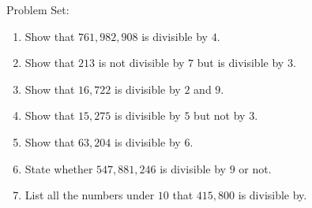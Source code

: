 \documentclass[16pt]{article}
\theoremstyle{remark}
\begin{document}
Problem Set:
\begin{enumerate}
\item Show that $761,982,908$ is divisible by $4$.
\vspace{3cm}
\item Show that $213$ is not divisible by $7$ but is divisible by $3$.
\vspace{3cm}
\item Show that $16,722$ is divisible by $2$ and $9$.
\vspace{3cm}
\newpage
\item Show that $15,275$ is divisible by $5$ but not by $3$.
\vspace{3cm}
\item Show that $63,204$ is divisible by $6$. 
\vspace{3cm}
\item State whether $547,881,246$ is divisible by $9$ or not.
\vspace{3cm}
\item List all the numbers under $10$ that $415,800$ is divisible by.
\end{enumerate}
\end{document}
